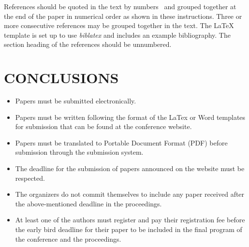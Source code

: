 \documentclass{eurodyn2026}
\begin{document}
References should be quoted in the text by numbers~\cite{Brown2022,Smith2023,Doe2024}
and grouped together at the end of the paper in numerical order as shown in
these instructions. Three or more consecutive references may be grouped together in the text. The LaTeX template is set up to use \textit{biblatex} and includes  an example bibliography. The section heading of the references should be unnumbered.

\section{CONCLUSIONS}

\begin{itemize}
  \item Papers must be submitted electronically.
  \item Papers must be written following the format of the LaTex or Word
    templates for submission that can be found at the conference website.
  \item Papers must be translated to Portable Document Format (PDF) before
    submission through the submission system.
  \item The deadline for the submission of papers announced on the website must be respected.
  \item The organizers do not commit themselves to include any paper received after the above-mentioned deadline in the proceedings.
  \item At least one of the authors must register and pay their
    registration fee before the early bird  deadline for their paper to
    be included in the final program of the conference and the proceedings.
\end{itemize}

\printbibliography{}
\end{document}
